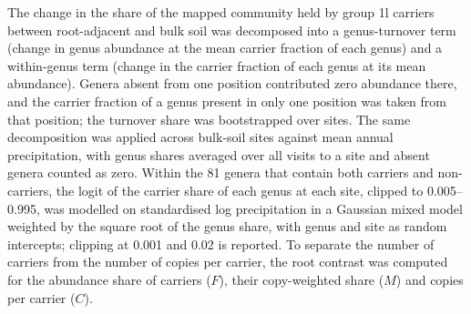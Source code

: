 \documentclass[11pt]{article}
\begin{document}
The change in the share of the mapped community held by group 1l carriers between root-adjacent and bulk
soil was decomposed into a genus-turnover term (change in genus abundance at the mean carrier fraction of
each genus) and a within-genus term (change in the carrier fraction of each genus at its mean abundance).
Genera absent from one position contributed zero abundance there, and the carrier fraction of a genus
present in only one position was taken from that position; the turnover share was bootstrapped over sites.
The same decomposition was applied across bulk-soil sites against mean annual precipitation, with genus
shares averaged over all visits to a site and absent genera counted as zero. Within the 81 genera that
contain both carriers and non-carriers, the logit of the carrier share of each genus at each site, clipped
to 0.005--0.995, was modelled on standardised log precipitation in a Gaussian mixed model weighted by the
square root of the genus share, with genus and site as random intercepts; clipping at 0.001 and 0.02 is
reported. To separate the number of carriers from the number of copies per
carrier, the root contrast was computed for the abundance share of carriers ($F$), their copy-weighted share
($M$) and copies per carrier ($C$).
\end{document}
